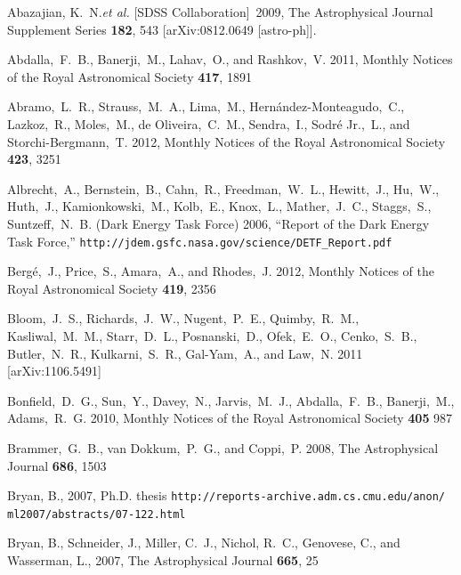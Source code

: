 \documentclass[useAMS,usenatbib,tightenlines,11pt,preprint]{aastex}
\begin{document}
\begin{thebibliography}{99}

  Abazajian, K.~N.{\it et al.}  [SDSS Collaboration]~2009,
  The Astrophysical Journal Supplement Series  {\bf 182}, 543
  [arXiv:0812.0649 [astro-ph]].

Abdalla,~F.~B., Banerji,~M., Lahav,~O., and Rashkov,~V. 2011,
Monthly Notices of the Royal Astronomical Society {\bf 417}, 1891

Abramo,~L.~R., Strauss,~M.~A., Lima,~M., Hern\'andez-Monteagudo,~C., Lazkoz,~R.,
Moles,~M., de Oliveira,~C.~M., Sendra,~I., Sodr\'e Jr.,~L., and
Storchi-Bergmann,~T. 2012, Monthly Notices of the Royal Astronomical Society
{\bf 423}, 3251

Albrecht,~A., Bernstein,~B., Cahn,~R., Freedman,~W.~L., Hewitt,~J.,
Hu,~W., Huth,~J., Kamionkowski,~M., Kolb,~E., Knox,~L., Mather,~J.~C.,
Staggs,~S., Suntzeff,~N.~B. (Dark Energy Task Force) 2006,
``Report of the Dark Energy Task Force,''
\verb|http://jdem.gsfc.nasa.gov/science/DETF_Report.pdf|


Berg\'e,~J., Price,~S., Amara,~A., and Rhodes,~J. 2012,
Monthly Notices of the Royal Astronomical Society {\bf 419}, 2356

Bloom,~J.~S., Richards,~J.~W., Nugent,~P.~E., Quimby,~R.~M., Kasliwal,~M.~M.,
Starr,~D.~L., Posnanski,~D., Ofek,~E.~O., Cenko,~S.~B., Butler,~N.~R.,
Kulkarni,~S.~R., Gal-Yam,~A., and Law,~N. 2011 [arXiv:1106.5491]

Bonfield,~D.~G., Sun,~Y., Davey,~N., Jarvis,~M.~J., Abdalla,~F.~B.,
Banerji,~M., Adams,~R.~G. 2010, Monthly Notices of the Royal Astronomical Society 
{\bf 405} 987

Brammer,~G.~B., van Dokkum,~P.~G., and Coppi,~P. 2008,
The Astrophysical Journal {\bf 686}, 1503

Bryan, B., 2007, Ph.D. thesis
\verb|http://reports-archive.adm.cs.cmu.edu/anon/|
\verb|ml2007/abstracts/07-122.html|

Bryan, B., Schneider, J., Miller, C.~J., Nichol, R.~C., Genovese, C., and
Wasserman, L., 2007,
The Astrophysical Journal {\bf 665}, 25


\end{thebibliography}
\end{document}
